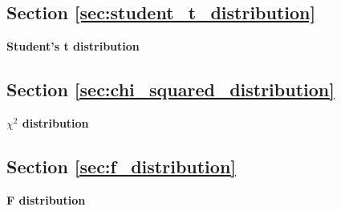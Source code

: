 \subsection{Section \ref{sec:student_t_distribution}}

\begin{exercise}
\label{ex:student}

\textbf{Student's t distribution} 



\end{exercise}

\subsection{Section \ref{sec:chi_squared_distribution}}

\begin{exercise}
\label{ex:chisq}

\textbf{\texorpdfstring{$\chi^2$}{chi-squared} distribution} 





\end{exercise}

\subsection{Section \ref{sec:f_distribution}}

\begin{exercise}
\label{ex:fdist}

\textbf{F distribution} 





\end{exercise}
